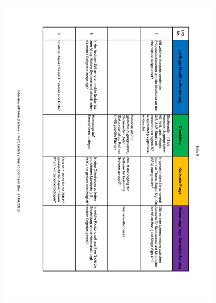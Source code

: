 \begin{figure}
	\centering
	\includegraphics[width=18cm]{kapitel/anhang/Interviewleitfaden_5}
\end{figure}

